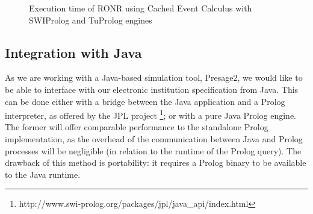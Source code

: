 \begin{figure}
\centering
{}
\caption{Execution time of RONR using Cached Event Calculus with SWIProlog and
TuProlog engines}\label{fig:cec}
\end{figure}

\subsection{Integration with Java}

As we are working with a Java-based simulation tool, Presage2, we would like
to be able to interface with our electronic institution specification from
Java. This can be done either with a bridge between the Java application and a
Prolog interpreter, as offered by the JPL project
\footnote{http://www.swi-prolog.org/packages/jpl/java\_api/index.html}; or with a pure Java Prolog
engine. The former will offer comparable performance to the standalone Prolog
implementation, as the overhead of the communication between Java and Prolog
processes will be negligible (in relation to the runtime of the Prolog query).
The drawback of this method is portability: it requires a Prolog binary to be
available to the Java runtime.

